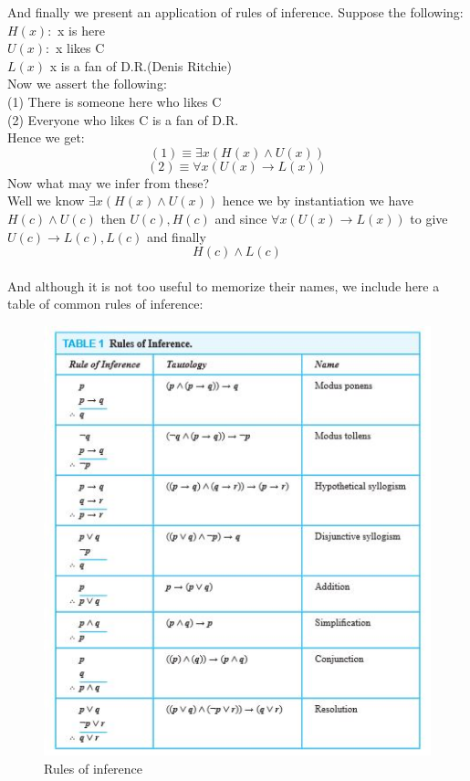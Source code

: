\documentclass[titlepage]{article}
\theoremstyle{definition}
\numberwithin{equation}{subsection}
\numberwithin{remark}{subsection}
\begin{document}
And finally we present an application of rules of inference. Suppose the following:
\\
$H(x):$ x is here
\\
$U(x):$ x likes C
\\
$L(x)$ x is a fan of D.R.(Denis Ritchie)
\\
Now we assert the following:
\\
(1) There is someone here who likes C
\\
(2) Everyone who likes C is a fan of D.R.
\\
Hence we get:
$$(1) \equiv \exists x(H(x) \land U(x))$$
$$(2) \equiv \forall x(U(x) \rightarrow L(x))$$
Now what may we infer from these?
\\
Well we know  $\exists x(H(x) \land U(x))$ hence we by instantiation we have $H(c) \land U(c)$ then $U(c),H(c)$ and since $ \forall x(U(x) \rightarrow L(x))$ to give $U(c) \rightarrow L(c), L(c)$ and finally $$H(c)\land L(c)$$
\\
And although it is not too useful to memorize their names, we include here a table of common rules of inference: 


\begin{figure}[H]
    \centering
    \includegraphics[scale = 0.9]{epflLectureNotes/advancedComputation/figures/inference.JPG}
    \caption{Rules of inference}
\end{figure}
\end{document}
